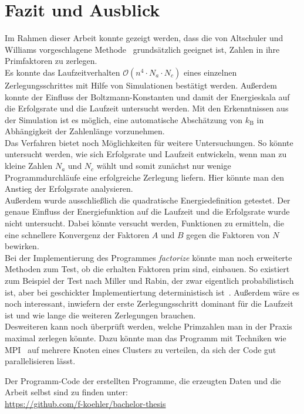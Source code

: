 \chapter{Fazit und Ausblick}\label{ch:conclusion}
Im Rahmen dieser Arbeit konnte gezeigt werden, dass die von Altschuler und Williams vorgeschlagene Methode~\parencite{altschuler} grundsätzlich geeignet ist, Zahlen in ihre Primfaktoren zu zerlegen. \\
Es konnte das Laufzeitverhalten $\mathcal{O}\left(n^4\cdot N_a \cdot N_c\right)$ eines einzelnen Zerlegungsschrittes mit Hilfe von Simulationen bestätigt werden. Außerdem konnte der Einfluss der Boltzmann-Konstanten und damit der Energieskala auf die Erfolgsrate und die Laufzeit untersucht werden. Mit den Erkenntnissen aus der Simulation ist es möglich, eine automatische Abschätzung von $k_\mathrm{B}$ in Abhängigkeit der Zahlenlänge vorzunehmen. \\
Das Verfahren bietet noch Möglichkeiten für weitere Untersuchungen. So könnte untersucht werden, wie sich Erfolgsrate und Laufzeit entwickeln, wenn man zu kleine Zahlen $N_a$ und $N_c$ wählt und somit zunächst nur wenige Programmdurchläufe eine erfolgreiche Zerlegung liefern. Hier könnte man den Anstieg der Erfolgsrate analysieren.\\
Außerdem wurde ausschließlich die quadratische Energiedefinition getestet. Der genaue Einfluss der Energiefunktion auf die Laufzeit und die Erfolgsrate wurde nicht untersucht. Dabei könnte versucht werden, Funktionen zu ermitteln, die eine schnellere Konvergenz der Faktoren $A$ und $B$ gegen die Faktoren von $N$ bewirken.  \\
Bei der Implementierung des Programmes \textit{factorize} könnte man noch erweiterte Methoden zum Test, ob die erhalten Faktoren prim sind, einbauen. So existiert zum Beispiel der Test nach Miller und Rabin, der zwar eigentlich probabilistisch ist, aber bei geschickter Implementiertung deterministisch ist~\parencite{miller}. Außerdem wäre es noch interessant, inwiefern der erste Zerlegungsschritt dominant für die Laufzeit ist und wie lange die weiteren Zerlegungen brauchen. \\
Desweiteren kann noch überprüft werden, welche Primzahlen man in der Praxis maximal zerlegen könnte. Dazu könnte man das Programm mit Techniken wie MPI~\parencite{mpi} auf mehrere Knoten eines Clusters zu verteilen, da sich der Code gut parallelisieren lässt.

\vfill
Der Programm-Code der erstellten Programme, die erzeugten Daten und die Arbeit selbst sind zu finden unter:\\
\url{https://github.com/f-koehler/bachelor-thesis}
